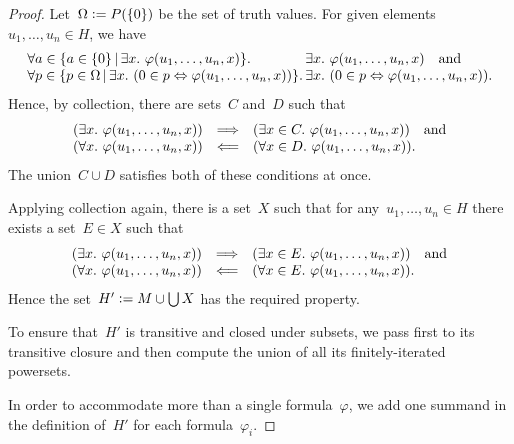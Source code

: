 \documentclass[oneside,reqno]{amsart}
\theoremstyle{definition}
\theoremstyle{plain}
\theoremstyle{remark}
\newcommand{\defeq}{\vcentcolon=}
\renewcommand{\_}{\mathpunct{.}\,}
\newcommand{\?}{\,{:}\,}
\begin{document}
\begin{proof}Let~$\Omega \defeq P(\{0\})$ be the set of truth values.
For given elements~$u_1,\ldots,u_n \in H$, we have
\[ \begin{array}{@{}l@{}l@{}}
  \forall a \in \{ a \in \{0\} \,|\, \exists x\_ \varphi(u_1,\ldots,u_n,x) \}\_ &
  \exists x\_ \varphi(u_1,\ldots,u_n,x) \quad\text{and} \\
  \forall p \in \{ p \in \Omega \,|\, \exists x\_ (0 \in p \Leftrightarrow
  \varphi(u_1,\ldots,u_n,x)) \}\_ &
  \exists x\_ (0 \in p \Leftrightarrow \varphi(u_1,\ldots,u_n,x)).
\end{array} \]
Hence, by collection, there are sets~$C$ and~$D$ such that
\[ \begin{array}{@{}rcl@{}}
  (\exists x\_ \varphi(u_1,\ldots,u_n,x)) &\Longrightarrow&
  (\exists x \in C\_ \varphi(u_1,\ldots,u_n,x)) \quad\text{and} \\
  (\forall x\_ \varphi(u_1,\ldots,u_n,x)) &\Longleftarrow&
  (\forall x \in D\_ \varphi(u_1,\ldots,u_n,x)).
\end{array} \]
The union~$C \cup D$ satisfies both of these conditions at once.

Applying collection again, there is a set~$X$ such that for
any~$u_1,\ldots,u_n \in H$ there exists a set~$E \in X$ such that
\[ \begin{array}{@{}rcl@{}}
  (\exists x\_ \varphi(u_1,\ldots,u_n,x)) &\Longrightarrow&
  (\exists x \in E\_ \varphi(u_1,\ldots,u_n,x)) \quad\text{and} \\
  (\forall x\_ \varphi(u_1,\ldots,u_n,x)) &\Longleftarrow&
  (\forall x \in E\_ \varphi(u_1,\ldots,u_n,x)).
\end{array} \]
Hence the set~$H' \defeq M \cup \bigcup X$ has the required property.

To ensure that~$H'$ is transitive and closed under subsets, we pass
first to its transitive closure and then compute the union of all its
finitely-iterated powersets.

In order to accommodate more than a single formula~$\varphi$, we add one summand
in the definition of~$H'$ for each formula~$\varphi_i$.
\end{proof}
\end{document}
